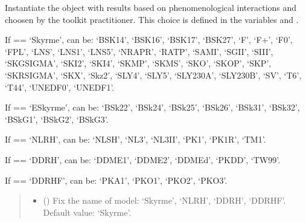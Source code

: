 \documentclass[letterpaper,10pt,english]{sphinxmanual}
\begin{document}
\begin{fulllineitems}
\label{\detokenize{source/api/setup_eos_pheno:nucleardatapy.eos.setup_pheno.setupPheno}}
\pysigstartsignatures
{}
\pysigstopsignatures
\sphinxAtStartPar
Instantiate the object with results based on phenomenological    interactions and choosen by the toolkit practitioner.     This choice is defined in the variables  and .

\sphinxAtStartPar
If  == ‘Skyrme’,  can be: ‘BSK14’,     ‘BSK16’, ‘BSK17’, ‘BSK27’, ‘F\sphinxhyphen{}’, ‘F+’, ‘F0’, ‘FPL’, ‘LNS’, ‘LNS1’, ‘LNS5’,     ‘NRAPR’, ‘RATP’, ‘SAMI’, ‘SGII’, ‘SIII’, ‘SKGSIGMA’, ‘SKI2’, ‘SKI4’, ‘SKMP’,     ‘SKMS’, ‘SKO’, ‘SKOP’, ‘SKP’, ‘SKRSIGMA’, ‘SKX’, ‘Skz2’, ‘SLY4’, ‘SLY5’,     ‘SLY230A’, ‘SLY230B’, ‘SV’, ‘T6’, ‘T44’, ‘UNEDF0’, ‘UNEDF1’.

\sphinxAtStartPar
If  == ‘ESkyrme’,  can be: ‘BSk22’, ‘BSk24’, ‘BSk25’,     ‘BSk26’, ‘BSk31’, ‘BSk32’, ‘BSkG1’, ‘BSkG2’, ‘BSkG3’.

\sphinxAtStartPar
If  == ‘NLRH’,  can be: ‘NL\sphinxhyphen{}SH’, ‘NL3’, ‘NL3II’, ‘PK1’, ‘PK1R’, ‘TM1’.

\sphinxAtStartPar
If  == ‘DDRH’,  can be: ‘DDME1’, ‘DDME2’, ‘DDMEd’, ‘PKDD’, ‘TW99’.

\sphinxAtStartPar
If  == ‘DDRHF’,  can be: ‘PKA1’, ‘PKO1’, ‘PKO2’, ‘PKO3’.
\begin{quote}\begin{description}
\begin{itemize}
\item {} 
\sphinxAtStartPar
{} (\sphinxstyleliteralemphasis{\sphinxupquote{, }}) \textendash{} Fix the name of model: ‘Skyrme’, ‘NLRH’,     ‘DDRH’, ‘DDRHF’. Default value: ‘Skyrme’.


\end{itemize}
\end{description}
\end{quote}
\end{fulllineitems}
\end{document}
